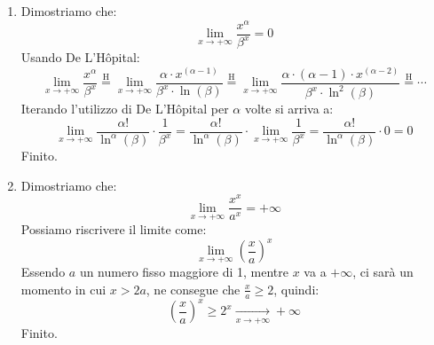 \begin{enumerate}
	\item Dimostriamo che:
		\begin{equation*}
			\lim_{x \to + \infty} \dfrac{x^\alpha}{\beta^x} = 0
		\end{equation*}
		Usando De L'Hôpital:
		\begin{equation*}
			\lim_{x \to + \infty} \dfrac{x^\alpha}{\beta^x} 
            \stackrel{\text{H}}{=} \lim_{x \to + \infty} \dfrac{\alpha 
            \cdot x^{(\alpha-1)}}{\beta^x \cdot \ln(\beta)} \stackrel{\text{H}}
            {=} \lim_{x \to + \infty} \dfrac{\alpha \cdot (\alpha-1) \cdot 
            x^{(\alpha-2)}}{\beta^x \cdot \ln^2(\beta)} \stackrel{\text{H}}{=} 
            \cdots 
		\end{equation*}
		Iterando l'utilizzo di De L'Hôpital per $\alpha$ volte si arriva a:
		\begin{equation*}
			\lim_{x \to + \infty} \dfrac{\alpha !}{\ln^\alpha (\beta)} \cdot 
            \dfrac{1}{\beta^x} = \dfrac{\alpha !}{\ln^\alpha (\beta)} \cdot 
            \lim_{x \to + \infty} \dfrac{1}{\beta^x} = \dfrac{\alpha !}
            {\ln^\alpha (\beta)} \cdot 0 = 0
		\end{equation*}
		Finito.

	\item Dimostriamo che:
		\begin{equation*}
			\lim_{x \to + \infty} \dfrac{x^x}{a^x} = +\infty
		\end{equation*}
		Possiamo riscrivere il limite come:
		\begin{equation*}
			\lim_{x \to + \infty} \left(\dfrac{x}{a}\right)^x
		\end{equation*}
		Essendo $a$ un numero fisso maggiore di 1, mentre $x$ va a $+\infty$, 
        ci sarà un momento in cui $x > 2a$, ne consegue che $\frac{x}{a} 
        \geq 2$, quindi:
		\begin{equation*}
			\left(\dfrac{x}{a}\right)^x \geq 2^x \xrightarrow[x \to +\infty]{} 
            +\infty
		\end{equation*}
		Finito.
\end{enumerate}

